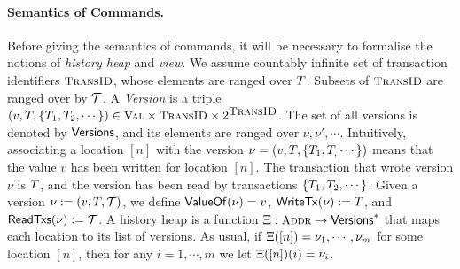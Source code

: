 \documentclass[a4paper,UKenglish]{article}%
\theoremstyle{plain}
\begin{document}
%
%
%

\paragraph{\textbf{Semantics of Commands.}}
Before giving the semantics of commands, it will be necessary to formalise 
the notions of \emph{history heap} and \emph{view}. 
We assume countably infinite set of transaction identifiers $\TransID$, whose elements 
are ranged over $T$. Subsets of $\TransID$ are ranged over by $\mathcal{T}$. 
A \emph{Version} is a triple 
$(v, \tsid, \{\tsid_1, \tsid_2,\cdots\}) \in \Val \times \TransID \times 2^{\TransID}$. 
The set of all versions is denoted by $\mathsf{Versions}$, and its elements are ranged over $\nu, \nu', \cdots$. 
Intuitively, associating a location $[n]$ with the version $\nu = (v, T, \{T_1,T_,\cdots\})$ means that the 
value $v$ has been written for location $[n]$. The transaction that wrote version $\nu$ is $T$, 
and the version has been read by transactions $\{T_1,T_2,\cdots\}$. 
Given a version $\nu := (v, T, \mathcal{T})$, we define $\mathsf{ValueOf}(\nu) = v$, $\mathsf{WriteTx}(\nu) := T$, 
and $\mathsf{ReadTxs}(\nu) := \mathcal{T}$.
A history heap is a function $\hh: \Addr \rightarrow \Versions^{\ast}$ that 
maps each location to its list of versions. As usual, if 
$\Xi([n]) = \nu_1,\cdots, \nu_m$ for some location $[n]$, then for any 
$i= 1,\cdots, m$ we let $\Xi([n])(i) = \nu_i$. 
\end{document}
